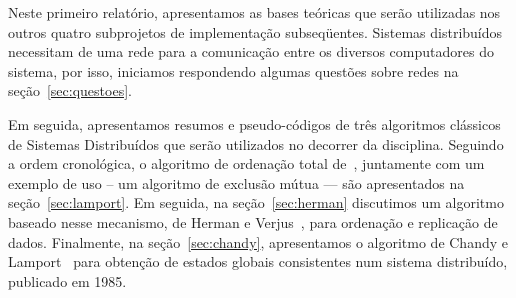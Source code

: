 Neste primeiro relatório, apresentamos as bases teóricas que serão
utilizadas nos outros quatro subprojetos de implementação
subseqüentes. Sistemas distribuídos necessitam de uma rede para a
comunicação entre os diversos computadores do sistema, por isso,
iniciamos respondendo algumas questões sobre redes na
seção~\ref{sec:questoes}.

Em seguida, apresentamos resumos e pseudo-códigos de três algoritmos
clássicos de Sistemas Distribuídos que serão utilizados no decorrer da
disciplina. Seguindo a ordem cronológica, o algoritmo de ordenação
total de~\cite{lamport78}, juntamente com um exemplo de uso -- um
algoritmo de exclusão mútua --- são apresentados na
seção~\ref{sec:lamport}. Em seguida, na seção~\ref{sec:herman}
discutimos um algoritmo baseado nesse mecanismo, de Herman e
Verjus~\cite{hermanv79}, para ordenação e replicação de
dados. Finalmente, na seção~\ref{sec:chandy}, apresentamos o algoritmo
de Chandy e Lamport~\cite{chandyl85} para obtenção de estados globais
consistentes num sistema distribuído, publicado em 1985.


